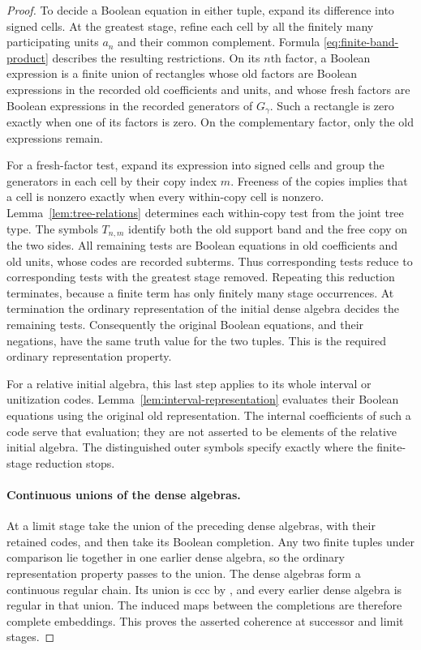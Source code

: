 \documentclass[11pt]{article}
\theoremstyle{definition}
\theoremstyle{remark}
\begin{document}
\begin{proof}
To decide a Boolean equation in either tuple, expand its difference into
signed cells.  At the greatest stage, refine each cell by all the finitely
many participating units $a_n$ and their common complement.  Formula
\eqref{eq:finite-band-product} describes the resulting restrictions.
On its $n$th factor, a Boolean expression is a finite union of rectangles
whose old factors are Boolean expressions in the recorded old
coefficients and units, and whose fresh factors are Boolean expressions
in the recorded generators of $G_\gamma$.  Such a rectangle is zero
exactly when one of its factors is zero.  On the complementary factor,
only the old expressions remain.

For a fresh-factor test, expand its expression into signed cells and
group the generators in each cell by their copy index $m$.  Freeness of
the copies implies that a cell is nonzero exactly when every within-copy
cell is nonzero.  Lemma~\ref{lem:tree-relations} determines each
within-copy test from the joint tree type.  The symbols $T_{n,m}$
identify both the old support band and the free copy on the two sides.
All remaining tests are Boolean equations in old coefficients and old
units, whose codes are recorded subterms.  Thus
corresponding tests reduce to corresponding tests with the greatest stage
removed.  Repeating this reduction terminates, because a finite term has
only finitely many stage occurrences.  At termination the ordinary
representation of the initial dense algebra decides the remaining tests.
Consequently the original Boolean equations, and their negations, have
the same truth value for the two tuples.  This is the required ordinary
representation property.

For a relative initial algebra, this last step applies to its whole
interval or unitization codes.  Lemma~\ref{lem:interval-representation}
evaluates their Boolean equations using the original old representation.
The internal coefficients of such a code serve that evaluation; they are
not asserted to be elements of the relative initial algebra.  The
distinguished outer symbols specify exactly where the finite-stage
reduction stops.

\paragraph{Continuous unions of the dense algebras.}
At a limit stage take the union of the preceding dense algebras, with their
retained codes, and then take its Boolean completion.  Any two finite
tuples under comparison lie together in one earlier dense algebra, so
the ordinary representation property passes to the union.  The dense
algebras form a continuous regular chain.  Its union is ccc by
\cite[Claim~2.10]{Shelah2026}, and every earlier dense algebra is regular
in that union.  The induced maps between the completions are therefore
complete embeddings.  This proves the asserted coherence at successor
and limit stages.
\end{proof}
\end{document}
